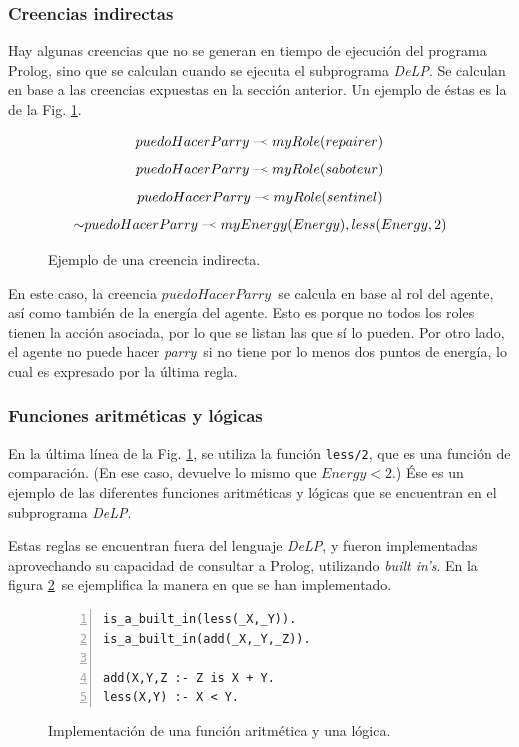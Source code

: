 \documentclass[oneside]{book}
\theoremstyle{definition}
\newcommand{\DLP}{\mbox{\textit{DeLP}}}
\newcommand{\no}{\mbox{$\sim$}}
\newcommand{\lit}[1]{\mbox{$ #1$}}
\newcommand{\drule}[2]{\mbox{$ #1\; \defleftarrow \; #2$}}
\newcommand{\defleftarrow}{{\raise1.5pt\hbox{\tiny\defleft}}}
\newcommand{\defleft}{\mbox{---\hspace{-1.5pt}\raise.05pt\hbox{$<$}}}
\newcommand{\nlA}[1]{$$\mbox{#1}$$}
\begin{document}
\subsubsection{Creencias indirectas}

\label{sec:creeciasIndirectas}

Hay algunas creencias que no se generan en tiempo de ejecución del programa Prolog, sino
que se calculan cuando se ejecuta el subprograma \DLP. Se calculan en base a las creencias
expuestas en la sección anterior. Un ejemplo de éstas es la de la Fig. 
\ref{fig:creenciaIndirecta}.

\begin{figure}[h]

\nlA{\drule{puedoHacerParry}{myRole(repairer)}}
\nlA{\drule{puedoHacerParry}{myRole(saboteur)}}
\nlA{\drule{puedoHacerParry}{myRole(sentinel)}}
\nlA{\drule{\no puedoHacerParry}{myEnergy(Energy), less(Energy,2)}}


\caption{Ejemplo de una creencia indirecta.}
\label{fig:creenciaIndirecta}

\end{figure}

En este caso, la creencia \lit{puedoHacerParry}\ se calcula en base al rol del 
agente,
así como también de la energía del agente. Esto es porque no todos los roles tienen la
acción asociada, por lo que se listan las que sí lo pueden. Por otro lado, el agente
no puede hacer \textit{parry}\ si no tiene por lo menos dos puntos de energía, lo cual
es expresado por la última regla.

\subsubsection{Funciones aritméticas y lógicas}

En la última línea de la Fig. \ref{fig:creenciaIndirecta}, se utiliza la función 
\texttt{less/2}, que es una función de comparación. (En ese caso, devuelve lo mismo
que $Energy < 2$.) Ése es un ejemplo de las diferentes funciones aritméticas y 
lógicas que se encuentran en el subprograma \DLP.

Estas reglas se encuentran fuera del lenguaje \DLP, y fueron implementadas 
aprovechando su capacidad de consultar a Prolog, utilizando \textit{built in's}.
En la figura \ref{fig:funciones}\ se ejemplifica la manera en que se han 
implementado.

\begin{figure}[h]
\begin{Verbatim}[numbers=left]
is_a_built_in(less(_X,_Y)).
is_a_built_in(add(_X,_Y,_Z)).

add(X,Y,Z :- Z is X + Y.
less(X,Y) :- X < Y.
\end{Verbatim}

\caption{Implementación de una función aritmética y una lógica.}
\label{fig:funciones}
\end{figure}
\end{document}
